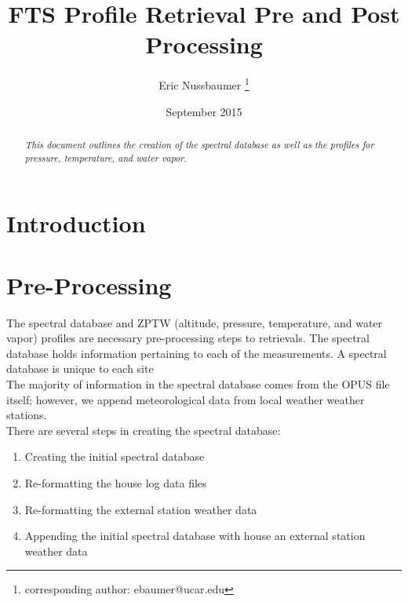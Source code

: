 \documentclass[12pt, letterpaper]{article}
\title{FTS Profile Retrieval Pre and Post Processing}
\author[1]{Eric Nussbaumer \thanks{corresponding author: ebaumer@ucar.edu}}
\affil[1]{National Center for Atmospheric Research, Boulder, CO, USA}
\date{September 2015}
\begin{document}
\begin{titlepage}

\maketitle
\thispagestyle{empty}
\pagestyle{empty}

\begin{abstract}
  \begin{adjustwidth}{2em}{2em} 
    \large{
      \emph{
This document outlines the creation of the spectral database as well as the profiles for pressure, temperature, and water vapor.
}}
      
  \end{adjustwidth}

\end{abstract}

\end{titlepage}
 
\newpage
\tableofcontents
\newpage


\section{Introduction} 
\label{sec:intro}

\section{Pre-Processing}
The spectral database and ZPTW (altitude, pressure, temperature, and water vapor) profiles are necessary pre-processing steps to retrievals. The spectral database holds information pertaining to each of the measurements. A spectral database is unique to each site\\

The majority of information in the spectral database comes from the OPUS file itself; however, we append meteorological data from local weather weather stations.\\

There are several steps in creating the spectral database:\\

\begin{enumerate}
\item Creating the initial spectral database
\item Re-formatting the house log data files
\item Re-formatting the external station weather data
\item Appending the initial spectral database with house an external station weather data
\end{enumerate}
\end{document}
